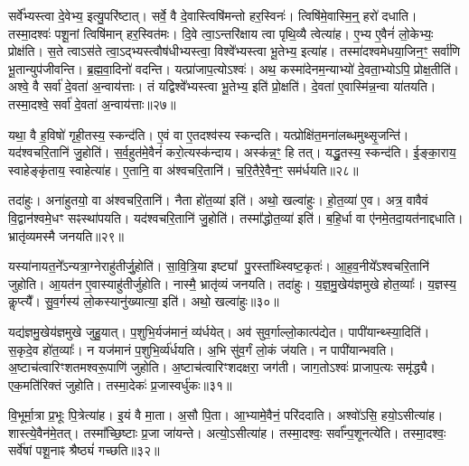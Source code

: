 सर्वे᳚भ्यस्त्वा दे॒वेभ्य॒ इत्यु॒परि॑ष्टात्।
सर्वे॒ वै दे॒वास्त्विषि॑मन्तो हर॒स्विनः॑।
त्विषि॑मे॒वास्मि॒न्॒ हरो॑ दधाति।
तस्मा॒दश्वः॑ पशू॒नां त्विषि॑मान्‌ हर॒स्वित॑मः।
दि॒वे त्वा॒\-ऽन्तरि॑क्षाय त्वा पृथि॒व्यै त्वेत्या॑ह।
ए॒भ्य ए॒वैनं॑ लो॒केभ्यः॒ प्रोक्ष॑ति।
स॒ते त्वा\-ऽस॑ते त्वा॒\-ऽद्भ्यस्त्वौष॑धीभ्यस्त्वा॒ विश्वे᳚भ्यस्त्वा भू॒तेभ्य॒ इत्या॑ह।
तस्मा॑दश्वमेधया॒जिन॒ꣳ॒ सर्वा॑णि भू॒तान्युप॑जीवन्ति।
ब्र॒ह्म॒वा॒दिनो॑ वदन्ति।
यत्प्रा॑जाप॒त्यो\-ऽश्वः॑।
अथ॒ कस्मा॑देनम॒न्याभ्यो॑ दे॒वता॒भ्योऽपि॒ प्रोक्ष॒तीति॑।
अश्वे॒ वै सर्वा॑ दे॒वता॑ अ॒न्वाय॑त्ताः।
तं यद्विश्वे᳚भ्यस्त्वा भू॒तेभ्य॒ इति॑ प्रो॒क्षति॑।
दे॒वता॑ ए॒वास्मि॑न्न॒न्वा या॑तयति।
तस्मा॒दश्वे॒ सर्वा॑ दे॒वता॑ अ॒न्वाय॑त्ताः॥२७॥\anuvakamend[सा॒र॒सा॒रित॒मो\-ऽप॑चिततमः प्राजाप॒त्यो\-ऽश्वः॒ पञ्च॑ च]

यथा॒ वै ह॒विषो॑ गृही॒तस्य॒ स्कन्द॑ति।
ए॒वं वा ए॒तदश्व॑स्य स्कन्दति।
यत्प्रोक्षि॑त॒मना॑लब्धमुथ्सृ॒जन्ति॑।
यद॑श्वचरि॒तानि॑ जु॒होति॑।
स॒र्व॒हुत॑मे॒वैनं॑ करो॒त्यस्क॑न्दाय।
अस्क॑न्न॒ꣳ॒ हि तत्।
यद्धु॒तस्य॒ स्कन्द॑ति।
ई॒ङ्का॒राय॒ स्वाहेङ्कृ॑ताय॒ स्वाहेत्या॑ह।
ए॒तानि॒ वा अ॑श्वचरि॒तानि॑।
च॒रि॒तैरे॒वैन॒ꣳ॒ सम॑र्धयति॥२८॥

तदा॑हुः।
अना॑हुतयो॒ वा अ॑श्वचरि॒तानि॑।
नैता हो॑त॒व्या॑ इति॑।
अथो॒ खल्वा॑हुः।
हो॒त॒व्या॑ ए॒व।
अत्र॒ वावैवं वि॒द्वान॑श्वमे॒धꣳ सꣴस्था॑पयति।
यद॑श्वचरि॒तानि॑ जु॒होति॑।
तस्मा᳚द्धोत॒व्या॑ इति॑।
ब॒हि॒र्धा वा ए॑नमे॒तदा॒यत॑नाद्दधाति।
भ्रातृ॑व्यमस्मै जनयति॥२९॥

यस्या॑नायत॒ने᳚\-ऽन्यत्रा॒ग्नेराहु॑तीर्जु॒होति॑।
सा॒वि॒त्रि॒या इष्ट्या᳚ पु॒रस्ता᳚थ्स्विष्ट॒कृतः॑।
आ॒ह॒व॒नीये᳚\-ऽश्वचरि॒तानि॑ जुहोति।
आ॒यत॑न ए॒वास्याहु॑तीर्जुहोति।
नास्मै॒ भ्रातृ॑व्यं जनयति।
तदा॑हुः।
य॒ज्ञ॒मु॒खेय॑ज्ञमुखे होत॒व्याः᳚।
य॒ज्ञस्य॒ कॢप्त्यै᳚।
सु॒व॒र्गस्य॑ लो॒कस्यानु॑ख्यात्या॒ इति॑।
अथो॒ खल्वा॑हुः॥३०॥

यद्य॑ज्ञमु॒खेय॑ज्ञमुखे जुहु॒यात्।
प॒शुभि॒र्यज॑मानं॒ व्य॑र्धयेत्।
अव॑ सुव॒र्गाल्लो॒कात्प॑द्येत।
पापी॑यान्थ्स्या॒दिति॑।
स॒कृदे॒व हो॑त॒व्याः᳚।
न यज॑मानं प॒शुभि॒र्व्य॑र्धयति।
अ॒भि सु॑व॒र्गं लो॒कं ज॑यति।
न पापी॑यान्भवति।
अ॒ष्टाच॑त्वारिꣳशतमश्वरू॒पाणि॑ जुहोति।
अ॒ष्टाच॑त्वारिꣳशदक्षरा॒ जग॑ती।
जाग॒तो\-ऽश्वः॑ प्राजाप॒त्यः समृ॑द्ध्यै।
एक॒मति॑रिक्तं जुहोति।
तस्मा॒देकः॑ प्र॒जास्वर्धु॑कः॥३१॥\anuvakamend[अ॒र्ध॒य॒ति॒ ज॒न॒य॒ति॒ खल्वा॑हु॒र्जग॑ती॒ त्रीणि॑ च]

वि॒भूर्मा॒त्रा प्र॒भूः पि॒त्रेत्या॑ह।
इ॒यं वै मा॒ता।
अ॒सौ पि॒ता।
आ॒भ्यामे॒वैनं॒ परि॑ददाति।
अश्वो॑ऽसि॒ हयो॒\-ऽसीत्या॑ह।
शास्त्ये॒वैन॑मे॒तत्।
तस्मा᳚च्छि॒ष्टाः प्र॒जा जा॑यन्ते।
अत्यो॒\-ऽसीत्या॑ह।
तस्मा॒दश्वः॒ सर्वा᳚न्प॒शूनत्ये॑ति।
तस्मा॒दश्वः॒ सर्वे॑षां पशू॒नाꣴ श्रैष्ठ्यं॑ गच्छति॥३२॥

